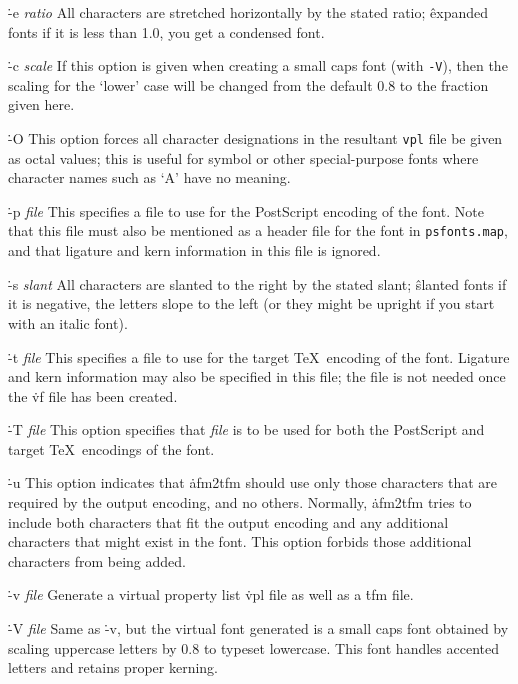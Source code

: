 {\options
\.{-e {\it ratio}}
All characters are stretched horizontally by the stated ratio;
\^{expanded fonts}
if it is less than 1.0, you get a condensed font.

\.{-c {\it scale}}
If this option is given when creating a small caps font
(with {\tt -V}), then the scaling for the `lower'
case will be changed from the default 0.8 to the fraction
given here.

\.{-O}
This option forces all character designations in the resultant
{\tt vpl} file be given as octal values; this is useful for
symbol or other special-purpose fonts where character names such
as `A' have no meaning.

\.{-p {\it file}}
This specifies a file to use for the PostScript encoding of the
font.  Note that this file must also be mentioned as a header
file for the font in {\tt psfonts.map}, and that ligature
and kern information in this file is ignored.

\.{-s {\it slant}}
All characters are slanted to the right by the stated slant;
\^{slanted fonts}
if it is negative, the letters slope to the left (or they might be
upright if you start with an italic font).

\.{-t {\it file}}
This specifies a file to use for the target \TeX\ encoding of the
font.  Ligature and kern information may also be specified in this
file; the file is not needed once the \.{vf} file has been created.

\.{-T {\it file}}
This option specifies that {\it file} is to be used for both
the PostScript and target \TeX\ encodings of the font.

\.{-u}
This option indicates that \.{afm2tfm} should use only those
characters that are required by the output encoding, and no
others.  Normally, \.{afm2tfm}
tries to include both characters that fit the output encoding
and any additional characters that might exist in the font.
This option forbids those additional characters from being
added.

\.{-v {\it file}}
Generate a virtual property list \.{vpl} file as well as a \.{tfm} file.

\.{-V {\it file}}
Same as \.{-v}, but the virtual font generated is a small caps font obtained
by scaling uppercase letters by 0.8 to typeset lowercase. This font
handles accented letters and retains proper kerning.\par}


